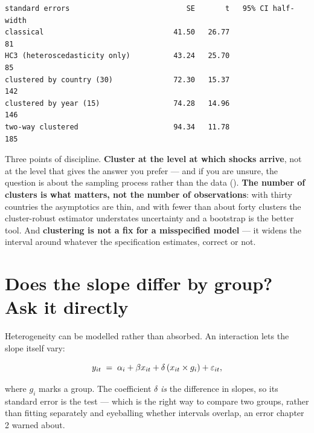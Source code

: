 \documentclass[
  letterpaper,
  10pt,
  twoside,
  openright,
  numbers=noenddot,
  chapterprefix=true]{scrbook}
\begin{document}
\begin{verbatim}
standard errors                           SE       t   95% CI half-width
classical                              41.50   26.77                  81
HC3 (heteroscedasticity only)          43.24   25.70                  85
clustered by country (30)              72.30   15.37                 142
clustered by year (15)                 74.28   14.96                 146
two-way clustered                      94.34   11.78                 185
\end{verbatim}

Three points of discipline. \textbf{Cluster at the level at which shocks
arrive}, not at the level that gives the answer you prefer --- and if
you are unsure, the question is about the sampling process rather than
the data (). \textbf{The
number of clusters is what matters, not the number of observations}:
with thirty countries the asymptotics are thin, and with fewer than
about forty clusters the cluster-robust estimator understates
uncertainty and a bootstrap is the better tool. And \textbf{clustering
is not a fix for a misspecified model} --- it widens the interval around
whatever the specification estimates, correct or not.

\section{Does the slope differ by group? Ask it
directly}\label{does-the-slope-differ-by-group-ask-it-directly}

Heterogeneity can be modelled rather than absorbed. An interaction lets
the slope itself vary:

\[
y_{it} \thickspace=\thickspace \alpha_i + \beta x_{it} + \delta\thinspace(x_{it} \times g_i) + \varepsilon_{it},
\]

where \(g_i\) marks a group. The coefficient \(\delta\) \emph{is} the
difference in slopes, so its standard error is the test --- which is the
right way to compare two groups, rather than fitting separately and
eyeballing whether intervals overlap, an error chapter 2 warned about.
\end{document}
